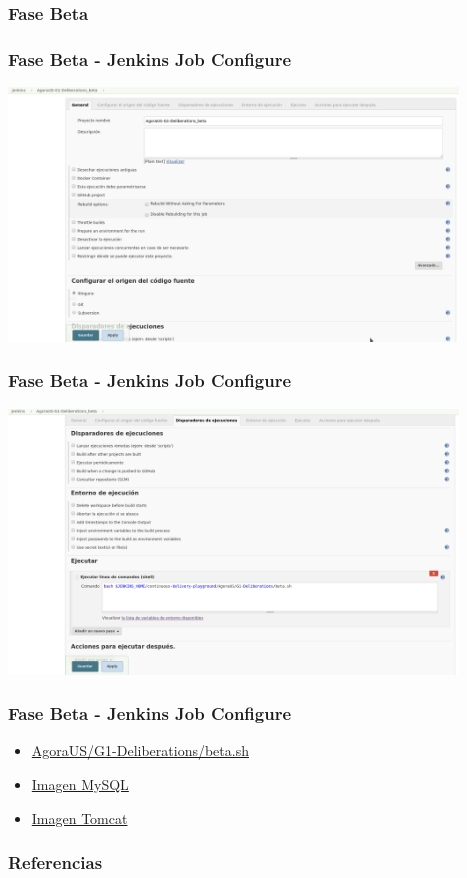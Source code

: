 \documentclass[
xcolor={svgnames},
hyperref={colorlinks,citecolor=DeepPink4,linkcolor=Black,urlcolor=DarkBlue}
]{beamer}
\begin{document}
\subsubsection{Fase Beta}
\begin{frame}
	\frametitle{Fase Beta - Jenkins Job Configure}
	\begin{center}
		\includegraphics[width=4.7in]{images/jenkins/beta_a/jenkins_betaA_1.png}
	\end{center}
\end{frame}

\begin{frame}
	\frametitle{Fase Beta - Jenkins Job Configure}
	\begin{center}
		\includegraphics[width=4.7in]{images/jenkins/beta_a/jenkins_betaA_2.png}
	\end{center}
\end{frame}

\begin{frame}[fragile]
	\frametitle{Fase Beta - Jenkins Job Configure}

	\begin{itemize}
		\item \href{https://github.com/AgoraUS-G1-1617/continuous-integration-agoraus_g1/blob/master/AgoraUS/G1-Deliberations/beta.sh}{AgoraUS/G1-Deliberations/beta.sh}
		\item \href{https://hub.docker.com/_/mysql/}{Imagen MySQL}
		\item \href{https://hub.docker.com/_/tomcat/}{Imagen Tomcat}
	\end{itemize}
	
	
	
\end{frame}


\begin{frame}[allowframebreaks]
	\frametitle{Referencias}

	
	 


\end{frame}
\end{document}
